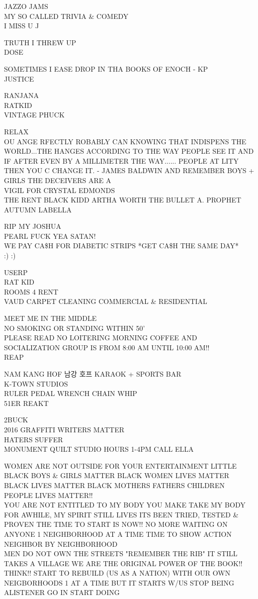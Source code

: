 \documentclass[10pt,letterpaper]{article}
\begin{document}
JAZZO JAMS\\
MY SO CALLED TRIVIA \& COMEDY\\
I MISS U J

TRUTH I THREW UP\\
DOSE

SOMETIMES I EASE DROP IN THA BOOKS OF ENOCH {-} KP\\
JUSTICE

RANJANA\\
RATKID\\
VINTAGE PHUCK

RELAX\\
OU ANGE RFECTLY ROBABLY CAN KNOWING THAT INDISPENS THE WORLD...THE HANGES ACCORDING TO THE WAY PEOPLE SEE IT AND IF AFTER EVEN BY A MILLIMETER THE WAY...... PEOPLE AT LITY THEN YOU C CHANGE IT. {-} JAMES BALDWIN AND REMEMBER BOYS + GIRLS THE DECEIVERS ARE A\\
VIGIL FOR CRYSTAL EDMONDS\\
THE RENT BLACK KIDD ARTHA WORTH THE BULLET A. PROPHET AUTUMN LABELLA

RIP MY JOSHUA\\
PEARL FUCK YEA SATAN!\\
WE PAY CA\$H FOR DIABETIC STRIPS *GET CA\$H THE SAME DAY*\\
:) :)

USERP\\
RAT KID\\
ROOMS 4 RENT\\
VAUD CARPET CLEANING COMMERCIAL \& RESIDENTIAL

MEET ME IN THE MIDDLE\\
NO SMOKING OR STANDING WITHIN 50'\\
PLEASE READ NO LOITERING MORNING COFFEE AND SOCIALIZATION GROUP IS FROM 8:00 AM UNTIL 10:00 AM!!\\
REAP

NAM KANG HOF 남강 호프 KARAOK + SPORTS BAR\\
K{-}TOWN STUDIOS\\
RULER PEDAL WRENCH CHAIN WHIP\\
51ER REAKT

2BUCK\\
2016 GRAFFITI WRITERS MATTER\\
HATERS SUFFER\\
MONUMENT QUILT STUDIO HOURS 1{-}4PM CALL ELLA

WOMEN ARE NOT OUTSIDE FOR YOUR ENTERTAINMENT LITTLE BLACK BOYS \& GIRLS MATTER BLACK WOMEN LIVES MATTER BLACK LIVES MATTER BLACK MOTHERS FATHERS CHILDREN PEOPLE LIVES MATTER!!\\
YOU ARE NOT ENTITLED TO MY BODY YOU MAKE TAKE MY BODY FOR AWHILE, MY SPIRIT STILL LIVES ITS BEEN TRIED, TESTED \& PROVEN THE TIME TO START IS NOW!!  NO MORE WAITING ON ANYONE 1 NEIGHBORHOOD AT A TIME TIME TO SHOW ACTION NEIGHBOR BY NEIGHBORHOOD\\
MEN DO NOT OWN THE STREETS "REMEMBER THE RIB" IT STILL TAKES A VILLAGE WE ARE THE ORIGINAL POWER OF THE BOOK!! THINK!! START TO REBUILD (US AS A NATION) WITH OUR OWN NEIGBORHOODS 1 AT A TIME BUT IT STARTS W/US STOP BEING ALISTENER GO IN START DOING
\end{document}
